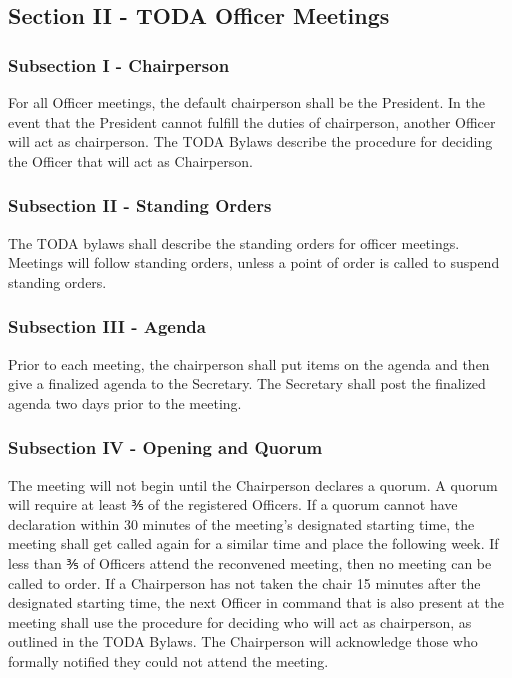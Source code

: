 \documentclass[11pt]{article}
\begin{document}
\subsection{Section II - TODA Officer Meetings}
\label{sec:orge805b40}

\subsubsection{Subsection I - Chairperson}
\label{sec:orgdee75f9}

For all Officer meetings, the default chairperson shall be the President. 
In the event that the President cannot fulfill the duties of chairperson, another Officer will act as chairperson. 
The TODA Bylaws describe the procedure for deciding the Officer that will act as Chairperson.

\subsubsection{Subsection II - Standing Orders}
\label{sec:org54667b0}

The TODA bylaws shall describe the standing orders for officer meetings. 
Meetings will follow standing orders, unless a point of order is called to suspend standing orders.

\subsubsection{Subsection III - Agenda}
\label{sec:orgcd649a4}

Prior to each meeting, the chairperson shall put items on the agenda and then give a finalized agenda to the Secretary. 
The Secretary shall post the finalized agenda two days prior to the meeting.

\subsubsection{Subsection IV - Opening and Quorum}
\label{sec:org8e10f6d}

The meeting will not begin until the Chairperson declares a quorum. 
A quorum will require at least ⅗ of the registered Officers. 
If a quorum cannot have declaration within 30 minutes of the meeting’s designated starting time, 
the meeting shall get called again for a similar time and place the following week. 
If less than ⅗ of Officers attend the reconvened meeting, then no meeting can be called to order.
If a Chairperson has not taken the chair 15 minutes after the designated starting time, 
the next Officer in command that is also present at the meeting shall use the procedure for deciding who will act as chairperson, 
as outlined in the TODA Bylaws.  
The Chairperson will acknowledge those who formally notified they could not attend the meeting.
\end{document}
